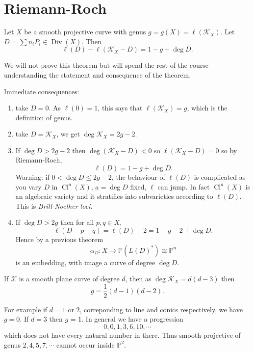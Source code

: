 \documentclass[a4paper]{article}
\DeclareMathOperator{\Cl}{Cl}
\renewcommand*{\P}{\mathbb{P}}
\DeclareMathOperator{\Div}{Div} %
\begin{document}
\section{Riemann-Roch}

\begin{theorem}
  Let \(X\) be a smooth projective curve with genus \(g = g(X) = \ell(\mathcal K_X)\). Let \(D = \sum n_i P_i \in \Div(X)\). Then
  \[
    \ell(D) - \ell(\mathcal K_X - D) = 1 - g + \deg D.
  \]
\end{theorem}
We will not prove this theorem but will spend the rest of the course understanding the statement and consequence of the theorem.

Immediate consequences:
\begin{enumerate}
\item take \(D = 0\). As \(\ell(0) = 1\), this says that \(\ell(\mathcal K_X) = g\), which is the definition of genus.
\item take \(D = \mathcal K_X\), we get \(\deg \mathcal K_X = 2g - 2\).
\item If \(\deg D > 2g - 2\) then \(\deg (\mathcal K_X - D) < 0\) so \(\ell(\mathcal K_X - D) = 0\) so by Riemann-Roch,
  \[
    \ell(D) = 1 - g + \deg D.
  \]
  Warning: if \(0 < \deg D \leq 2g - 2\), the behaviour of \(\ell(D)\) is complicated as you vary \(D\) in \(\Cl^a(X)\), \(a = \deg D\) fixed, \(\ell\) can jump. In fact \(\Cl^a(X)\) is an algebraic variety and it stratifies into subvarieties according to \(\ell(D)\). This is \emph{Brill-Noether loci}.
\item If \(\deg D > 2g\) then for all \(p, q \in X\),
  \[
    \ell(D - p - q) = \ell(D) - 2 = 1- g - 2 + \deg D.
  \]
  Hence by a previous theorem
  \[
    \alpha_D: X \to \P(L(D)^*) \cong \P^n
  \]
  is an embedding, with image a curve of degree \(\deg D\).
\end{enumerate}

\begin{corollary}
  If \(\mathcal X\) is a smooth plane curve of degree \(d\), then as \(\deg \mathcal K_X = d(d - 3)\) then
  \[
    g = \frac{1}{2}(d - 1)(d - 2).
  \]
\end{corollary}

For example if \(d = 1\) or \(2\), correponding to line and conics respectively, we have \(g = 0\). If \(d = 3\) then \(g\) = 1. In general we have a progression
\[
  0, 0, 1, 3, 6, 10, \cdots
\]
which does not have every natural number in there. Thus smooth projective of genus \(2, 4, 5, 7, \cdots\) cannot occur inside \(\P^2\).
\end{document}
